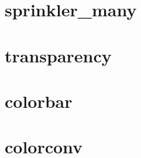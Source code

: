 \documentclass[11pt,twoside]{book}
\newcommand{\fdsinput}[1]{
{
\scriptsize

}
}
\begin{document}
\section{sprinkler\_many}
\label{SSFspinklermany}
\fdsinput{sprinkler_many.ssf}

\section{transparency}
\label{SSFtransparency}
\fdsinput{transparency.ssf}

\section{colorbar}
\label{SSFcolorbar}
\fdsinput{colorbar.ssf}

\section{colorconv}
\label{SSFcolorconv}
\fdsinput{colorconv.ssf}
\end{document}
